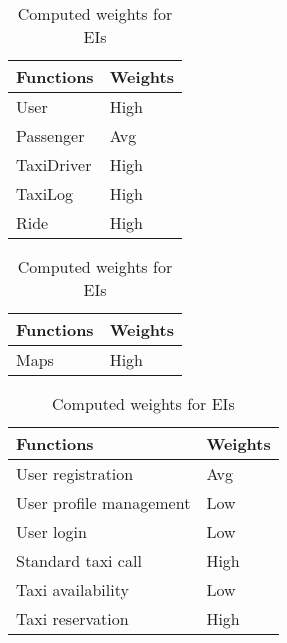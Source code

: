 \begin{table}[h]
\centering
\begin{subtable}{\textwidth}
    \centering
    \begin{tabular}{| l | l |}
        \hline
        \textbf{Functions} & \textbf{Weights} \\
        \hline
        User & High\\
        Passenger & Avg\\
        TaxiDriver & High\\
        TaxiLog & High\\
        Ride & High\\
        \hline
    \end{tabular}
    \caption{Computed weights for ILFs}
\end{subtable}

\vspace{2em}

\begin{subtable}{\textwidth}
    \centering
    \begin{tabular}{| l | l |}
        \hline
        \textbf{Functions} & \textbf{Weights} \\
        \hline
        Maps & High\\
        \hline
    \end{tabular}
    \caption{Computed weights for EIFs}
\end{subtable}

\vspace{2em}

\begin{subtable}{\textwidth}
    \centering
    \begin{tabular}{| l | l |}
        \hline
        \textbf{Functions} & \textbf{Weights} \\
        \hline
        User registration & Avg\\
        User profile management & Low\\
        User login & Low\\
        Standard taxi call & High\\
        Taxi availability & Low\\
        Taxi reservation & High\\
        \hline
    \end{tabular}
    \caption{Computed weights for EIs}
\end{subtable}

\vspace{2em}


\end{table}
